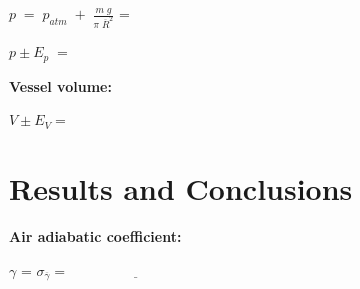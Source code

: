 \documentclass{article}
\begin{document}
\vspace{5mm}

$p \; = \; p_{atm} \; + \; \frac{m \; g}{\pi \;
\overline{R}^2}$ = \underline{\hspace{4cm}}

\vspace{5mm}

$p\pm E_p \; = $ \underline{\hspace{4cm}}

\vspace{5mm}


\textbf{Vessel volume:}

\vspace{5mm}

$V \pm E_V = $ \underline{\hspace{3cm}}
%


\section{Results and Conclusions}

\vspace{10mm}

\textbf{Air adiabatic coefficient:}

\vspace{5mm}
{\LARGE
$\gamma$ = \underline{\hspace{4cm}}
\hspace{1cm}
$\sigma_{\overline{\gamma}}=\underline{\hspace{4cm}}$
}

\nocite{Smith:2012qr}






\end{document}
